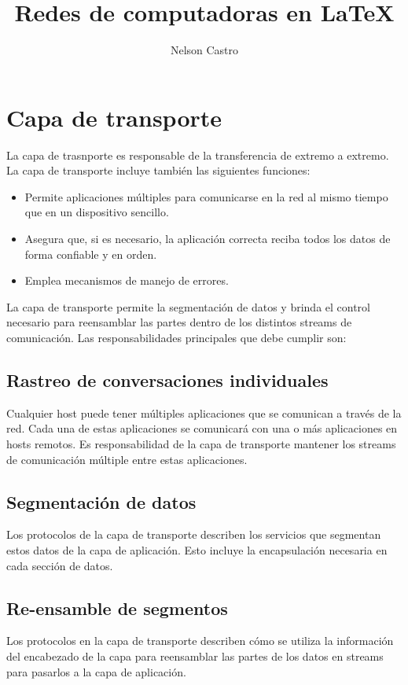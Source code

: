 \documentclass[12pt]{report}
\title{Redes de computadoras en \LaTeX}
\author{Nelson Castro}
\begin{document}
        \maketitle
        \newpage
        \section{Capa de transporte}
        La capa de trasnporte es responsable de la transferencia de extremo a extremo.
        La capa de transporte incluye también las siguientes funciones:
        \begin{itemize}
            \item Permite aplicaciones múltiples para comunicarse en la red al mismo tiempo que en un dispositivo sencillo. 
            \item Asegura que, si es necesario, la aplicación correcta reciba todos los datos de forma confiable y en orden.
            \item Emplea mecanismos de manejo de errores.
        \end{itemize}
        La capa de transporte permite la segmentación de datos y brinda el control necesario para reensamblar las partes dentro de los distintos streams de comunicación. Las responsabilidades principales que debe cumplir son:
        \subsection{Rastreo de conversaciones individuales}
        Cualquier host puede tener múltiples aplicaciones que se comunican a través de la red. Cada una de estas aplicaciones se comunicará con una o más aplicaciones en hosts remotos. Es responsabilidad de la capa de transporte mantener los streams de comunicación múltiple entre estas aplicaciones.
        \subsection{Segmentación de datos}
        Los protocolos de la capa de transporte describen los servicios que segmentan estos datos de la capa de aplicación. Esto incluye la encapsulación necesaria en cada sección de datos. 
        \subsection{Re-ensamble de segmentos}
        Los protocolos en la capa de transporte describen cómo se utiliza la información del encabezado de la capa para reensamblar las partes de los datos en streams para pasarlos a la capa de aplicación.
\end{document}
